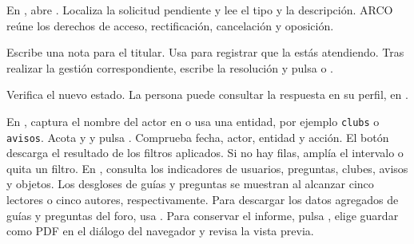 \begin{pasos}
\item En , abre . Localiza la solicitud pendiente y lee el tipo y la descripción. ARCO reúne los derechos de acceso, rectificación, cancelación y oposición.
\item Escribe una nota para el titular. Usa  para registrar que la estás atendiendo. Tras realizar la gestión correspondiente, escribe la resolución y pulsa  o .
\item Verifica el nuevo estado. La persona puede consultar la respuesta en su perfil, en .
\end{pasos}
En , captura el nombre del actor en  o usa una entidad, por ejemplo \texttt{clubs} o \texttt{avisos}. Acota  y  y pulsa . Comprueba fecha, actor, entidad y acción. El botón  descarga el resultado de los filtros aplicados. Si no hay filas, amplía el intervalo o quita un filtro.
En , consulta los indicadores de usuarios, preguntas, clubes, avisos y objetos. Los desgloses de guías y preguntas se muestran al alcanzar cinco lectores o cinco autores, respectivamente. Para descargar los datos agregados de guías y preguntas del foro, usa . Para conservar el informe, pulsa , elige guardar como PDF en el diálogo del navegador y revisa la vista previa.

